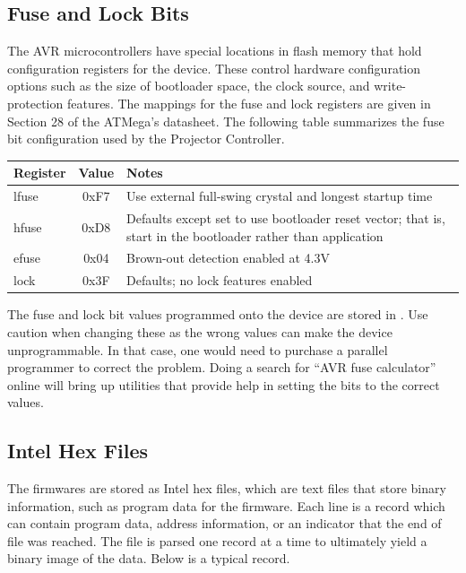 \documentclass{article}
\begin{document}
\subsection{Fuse and Lock Bits} \label{ssec:FWFuseBits}
The AVR microcontrollers have special locations in flash memory that hold configuration registers for
the device.  These control hardware configuration options such as the size of bootloader space, the
clock source, and write-protection features.  The mappings for the fuse and lock registers are given
in Section 28 of the ATMega's datasheet.  The following table summarizes the fuse bit configuration
used by the Projector Controller.

\begin{center}
    \begin{tabular}{l|c|p{}}
        Register & Value & Notes \\
        \hline
        lfuse & 0xF7 & Use external full-swing crystal and longest startup time \\
        hfuse & 0xD8 & Defaults except set to use bootloader reset vector; that is, start in the
        bootloader rather than application \\
        efuse & 0x04 & Brown-out detection enabled at 4.3V \\
        lock  & 0x3F & Defaults; no lock features enabled \\
    \end{tabular}
\end{center}

The fuse and lock bit values programmed onto the device are stored in
.  Use caution when changing these as the wrong values can
make the device unprogrammable.  In that case, one would need to purchase a parallel programmer to
correct the problem.  Doing a search for ``AVR fuse calculator'' online will bring up utilities that
provide help in setting the bits to the correct values.

\subsection{Intel Hex Files} \label{ssec:FWIntelHex}
The firmwares are stored as Intel hex files, which are text files that store binary information,
such as program data for the firmware.  Each line is a record which can contain program data, 
address information, or an indicator that the end of file was reached.  The file is parsed one
record at a time to ultimately yield a binary image of the data.  Below is a typical record.
\end{document}

